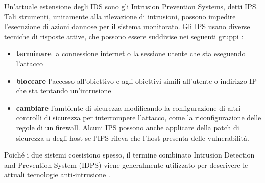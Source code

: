 \documentclass[../main.tex]{subfiles}
\begin{document}
Un'attuale estensione degli IDS sono gli Intrusion Prevention Systems, detti IPS. Tali strumenti, unitamente alla rilevazione di intrusioni, possono impedire l'esecuzione di azioni dannose per il sistema monitorato. Gli IPS usano diverse tecniche di risposte attive, che possono essere suddivise nei seguenti gruppi \cite{IPS}:

\begin{itemize}
				\item \textbf{terminare} la connessione internet o la sessione utente che sta eseguendo l'attacco
				\item \textbf{bloccare} l'accesso all'obiettivo e agli obiettivi simili all'utente o indirizzo IP che sta tentando un'intrusione
				\item \textbf{cambiare} l'ambiente di sicurezza modificando la configurazione di altri controlli di sicurezza per interrompere l'attacco, come la riconfigurazione delle regole di un firewall. Alcuni IPS possono anche applicare della patch di sicurezza a degli host se l'IPS rileva che l'host presenta delle vulnerabilità.
\end{itemize}

Poiché i due sistemi coesistono spesso, il termine combinato Intrusion Detection and Prevention System (IDPS) viene generalmente utilizzato per descrivere le attuali tecnologie anti-intrusione \cite{IPS}.
\end{document}
